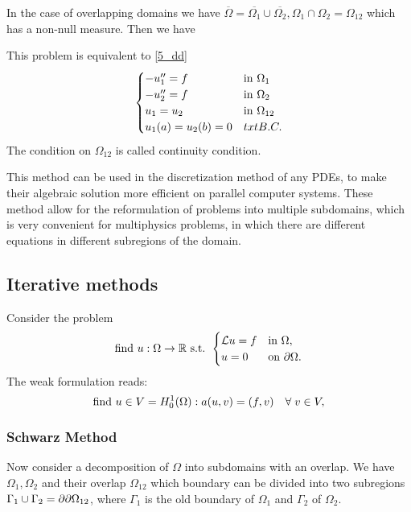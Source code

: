 In the case of overlapping domains we have \(\overline{\Omega} = \overline{\Omega_1} \cup \overline{\Omega_2}, \Omega_1 \cap \Omega_2 = \Omega_{12}\) which has a non-null measure.
Then we have
\begin{proposition}
    This problem is equivalent to \eqref{5_dd}
    \begin{equation}
        \begin{cases}
            -u''_1 = f & \text{in }\Omega_1 \\
            -u''_2 = f & \text{in }\Omega_2 \\
            u_1 =  u_2 & \text{in } \Omega_{12} \\
            u_1(a) = u_2(b) = 0 & txt{B.C.}
        \end{cases}
        \label{8_dd}
    \end{equation}
    The condition on \(\Omega_{12}\) is called continuity condition.
\end{proposition}
This method can be used in the discretization method of any PDEs, to make their algebraic solution more efficient on parallel computer systems. These method allow for the reformulation of problems into multiple subdomains, which is very convenient for multiphysics problems, in which there are different equations in different subregions of the domain.

\subsection{Iterative methods}
Consider the problem
\begin{equation}
    \text{find } u :\Omega \to \mathbb{R} \text{ s.t. }
    \begin{cases}
        \mathcal{L} u = f & \text{in } \Omega, \\ 
        u = 0 & \text{on } {\partial\Omega}.
    \end{cases}
    \label{model_problem_dd}
\end{equation}
The weak formulation reads: 
\begin{equation*}
    \text{find } u \in V = H^1_0(\Omega) : a(u,v) = (f,v) \quad \forall \; v \in V,
\end{equation*}
\subsubsection*{Schwarz Method}
Now consider a decomposition of \(\Omega\) into subdomains with an overlap. We have \(\Omega_1,\Omega_2\) and their overlap \(\Omega_{12}\) which boundary can be divided into two subregions \(\Gamma_1 \cup \Gamma_2 = \partial{\partial\Omega}_{12}\), where \(\Gamma_1\) is the old boundary of \(\Omega_1\) and \(\Gamma_2\) of \(\Omega_2\). 

